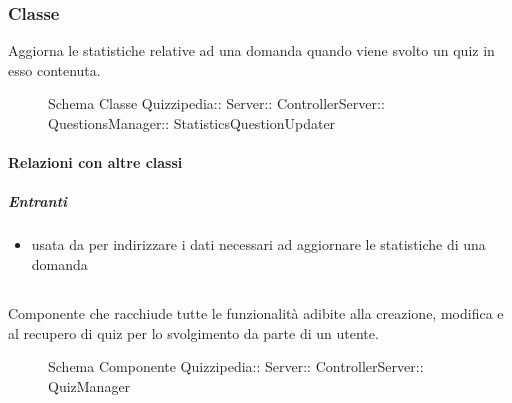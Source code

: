 \subsubsection{Classe }
Aggiorna le statistiche relative ad una domanda quando viene svolto un quiz in esso contenuta.
\begin{figure}[H]
\centering
\noindent{}
\caption[Schema Classe StatisticsQuestionUpdater]{Schema Classe Quizzipedia:: Server:: ControllerServer:: QuestionsManager:: StatisticsQuestionUpdater}
\end{figure}
\paragraph{Relazioni con altre classi}
\subparagraph{Entranti}
\begin{itemize}
\item usata da  per indirizzare i dati necessari ad aggiornare le statistiche di una domanda
\end{itemize}
\subsection{}
Componente che racchiude tutte le funzionalità adibite alla creazione, modifica e al recupero di quiz per lo svolgimento da parte di un utente.
\begin{figure}[H]
\centering
\noindent{}
\caption[Schema Componente QuizManager]{Schema Componente Quizzipedia:: Server:: ControllerServer:: QuizManager}
\end{figure}
